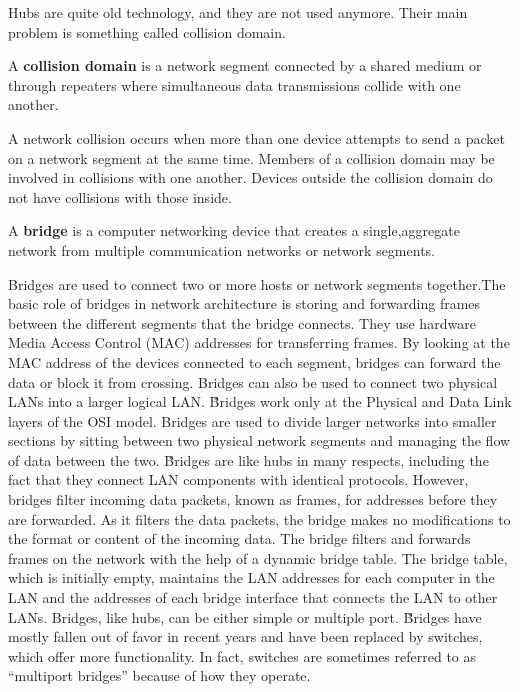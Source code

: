 Hubs are quite old technology, and they are not used anymore. Their main problem is something called collision domain.

A \textbf{collision domain} is a network segment connected by a shared medium or through repeaters where simultaneous
data transmissions collide with one another.
\ed

A network collision occurs when more than one device attempts to send a packet on a network segment at the same time.
Members of a collision domain may be involved in collisions with one another. Devices outside the collision domain do
not have collisions with those inside.

\bd[Bridge]
A \textbf{bridge} is a computer networking device that creates a single,aggregate network from multiple communication
networks or network segments.
\ed


Bridges are used to connect two or more hosts or network segments together.The basic role of bridges in network
architecture is storing and forwarding frames between the different segments that the bridge connects. They use
hardware Media Access Control (MAC) addresses for transferring frames. By looking at the MAC address of the devices
connected to each segment, bridges can forward the data or block it from crossing. Bridges can also be used to
connect two physical LANs into a larger logical LAN. \v

Bridges work only at the Physical and Data Link layers of the OSI model. Bridges are used to divide larger networks
into smaller sections by sitting between two physical network segments and managing the flow of data between the two. \v

Bridges are like hubs in many respects, including the fact that they connect LAN components with identical protocols.
However, bridges filter incoming data packets, known as frames, for addresses before they are forwarded. As it
filters the data packets, the bridge makes no modifications to the format or content of the incoming data. The bridge
filters and forwards frames on the network with the help of a dynamic bridge table. The bridge table, which is
initially empty, maintains the LAN addresses for each computer in the LAN and the addresses of each bridge interface
that connects the LAN to other LANs. Bridges, like hubs, can be either simple or multiple port. \v

Bridges have mostly fallen out of favor in recent years and have been replaced by switches, which offer more
functionality. In fact, switches are sometimes referred to as ``multiport bridges'' because of how they operate.

